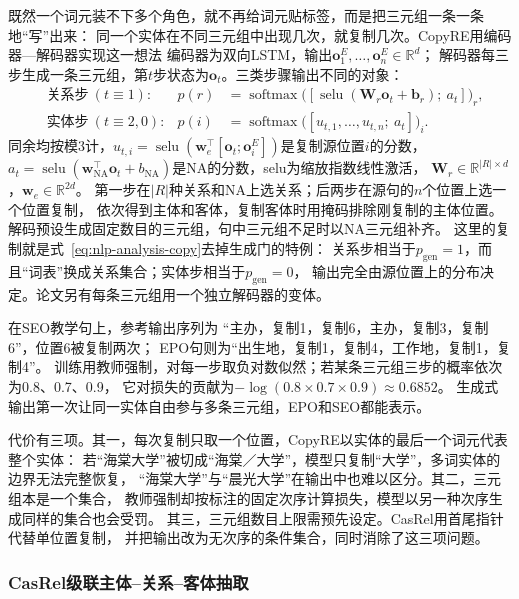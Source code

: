既然一个词元装不下多个角色，就不再给词元贴标签，而是把三元组一条一条地“写”出来：
同一个实体在不同三元组中出现几次，就复制几次。CopyRE用编码器—解码器实现这一想法
编码器为双向LSTM，输出$\bm{o}^{E}_1,\ldots,\bm{o}^{E}_n\in\mathbb{R}^{d}$；
解码器每三步生成一条三元组，第$t$步状态为$\bm{o}_t$。三类步骤输出不同的对象：
\begin{equation}
  \begin{aligned}
    &\text{关系步}\ (t\equiv1):&
      p(r)&=\operatorname{softmax}\bigl([\operatorname{selu}(\bm{W}_r\bm{o}_t+\bm{b}_r);\ a_t]\bigr)_r,\\
    &\text{实体步}\ (t\equiv2,0):&
      p(i)&=\operatorname{softmax}\bigl([u_{t,1},\ldots,u_{t,n};\ a_t]\bigr)_i.
  \end{aligned}
  \label{eq:nlp-extraction-copyre}
\end{equation}
同余均按模3计，$u_{t,i}=\operatorname{selu}(\bm{w}_e^{\top}[\bm{o}_t;\bm{o}^{E}_i])$是复制源位置$i$的分数，
$a_t=\operatorname{selu}(\bm{w}_{\mathrm{NA}}^{\top}\bm{o}_t+b_{\mathrm{NA}})$是NA的分数，selu为缩放指数线性激活，
$\bm{W}_r\in\mathbb{R}^{|R|\times d}$，$\bm{w}_e\in\mathbb{R}^{2d}$。
第一步在$|R|$种关系和NA上选关系；后两步在源句的$n$个位置上选一个位置复制，
依次得到主体和客体，复制客体时用掩码排除刚复制的主体位置。
解码预设生成固定数目的三元组，句中三元组不足时以NA三元组补齐。
这里的复制就是式~\eqref{eq:nlp-analysis-copy}去掉生成门的特例：
关系步相当于$p_{\mathrm{gen}}=1$，而且“词表”换成关系集合；实体步相当于$p_{\mathrm{gen}}=0$，
输出完全由源位置上的分布决定。论文另有每条三元组用一个独立解码器的变体。

在SEO教学句上，参考输出序列为
“主办，复制1，复制6，主办，复制3，复制6”，位置6被复制两次；
EPO句则为“出生地，复制1，复制4，工作地，复制1，复制4”。
训练用教师强制，对每一步取负对数似然；若某条三元组三步的概率依次为0.8、0.7、0.9，
它对损失的贡献为$-\log(0.8\times0.7\times0.9)\approx0.6852$。
生成式输出第一次让同一实体自由参与多条三元组，EPO和SEO都能表示。

代价有三项。其一，每次复制只取一个位置，CopyRE以实体的最后一个词元代表整个实体：
若“海棠大学”被切成“海棠／大学”，模型只复制“大学”，多词实体的边界无法完整恢复，
“海棠大学”与“晨光大学”在输出中也难以区分。其二，三元组本是一个集合，
教师强制却按标注的固定次序计算损失，模型以另一种次序生成同样的集合也会受罚。
其三，三元组数目上限需预先设定。CasRel用首尾指针代替单位置复制，
并把输出改为无次序的条件集合，同时消除了这三项问题。

\subsubsection{CasRel级联主体--关系--客体抽取}
\label{sec:nlp-extraction-casrel}

